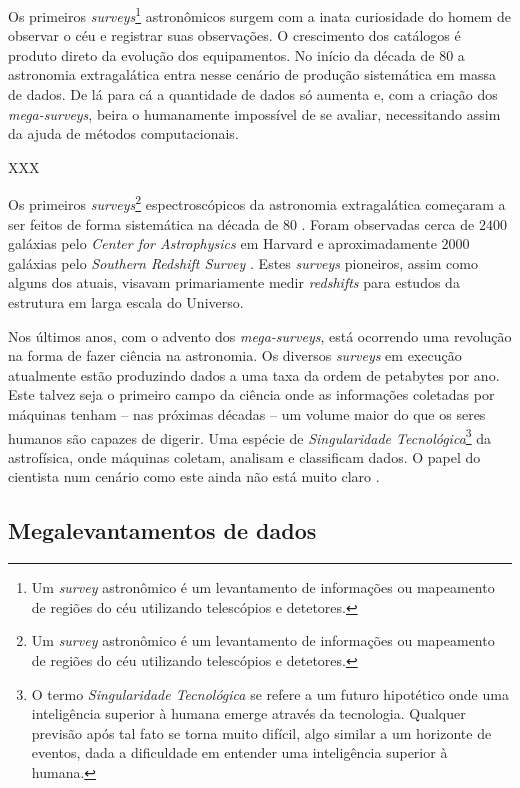 Os primeiros {\em surveys}\footnote{Um {\em survey} astronômico é um
levantamento de informações ou mapeamento de regiões do céu utilizando
telescópios e detetores.} astronômicos surgem com a inata curiosidade do homem
de observar o céu e registrar suas observações. O crescimento dos catálogos é
produto direto da evolução dos equipamentos. No início da década de 80
\citep{Huchra1983} \citep{Huchra1988} \citep{DaCosta1988} a astronomia
extragalática entra nesse cenário de produção sistemática em massa de dados. De
lá para cá a quantidade de dados só aumenta e, com a criação dos {\em
mega-surveys}, beira o humanamente impossível de se avaliar, necessitando assim
da ajuda de métodos computacionais.

XXX

Os primeiros {\em surveys}\footnote{Um {\em survey} astronômico é um
levantamento de informações ou mapeamento de regiões do céu utilizando
telescópios e detetores.} espectroscópicos da astronomia extragalática começaram
a ser feitos de forma sistemática na década de 80 \citep{Huchra1988}. Foram
observadas cerca de $2400$ galáxias pelo {\em Center for Astrophysics} em
Harvard \citep{Huchra1983} e aproximadamente $2000$ galáxias pelo {\em Southern
Redshift Survey} \citep{DaCosta1988}. Estes {\em surveys} pioneiros, assim como
alguns dos atuais, visavam primariamente medir {\em redshifts} para estudos da
estrutura em larga escala do Universo.

Nos últimos anos, com o advento dos {\em mega-surveys}, está ocorrendo uma
revolução na forma de fazer ciência na astronomia. Os diversos {\em surveys} em
execução atualmente estão produzindo dados a uma taxa da ordem de petabytes por
ano. Este talvez seja o primeiro campo da ciência onde as informações coletadas
por máquinas tenham -- nas próximas décadas -- um volume maior do que os seres
humanos são capazes de digerir. Uma espécie de {\em Singularidade
Tecnológica}\footnote{O termo {\em Singularidade Tecnológica} se refere a um
futuro hipotético onde uma inteligência superior à humana emerge através da
tecnologia. Qualquer previsão após tal fato se torna muito difícil, algo similar
a um horizonte de eventos, dada a dificuldade em entender uma inteligência
superior à humana.} da astrofísica, onde máquinas coletam, analisam e
classificam dados. O papel do cientista num cenário como este ainda não está
muito claro \citep{Norris2010}.

\subsection{Megalevantamentos de dados}

